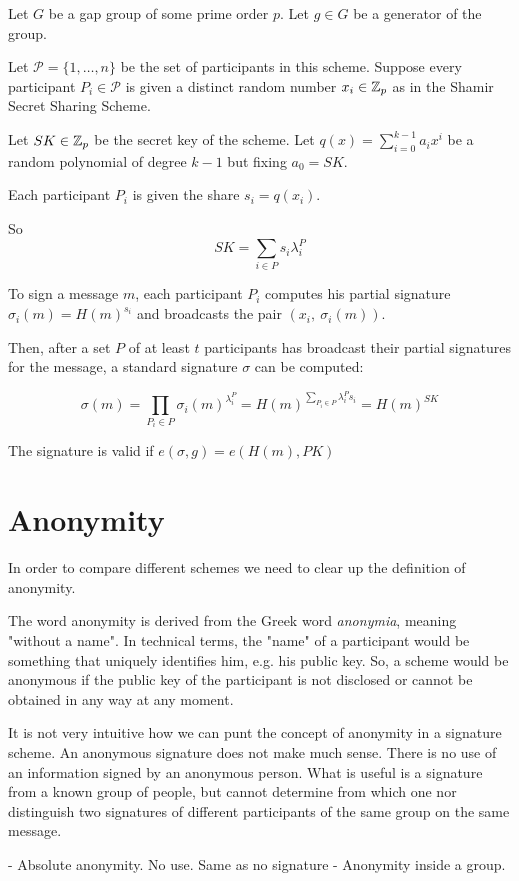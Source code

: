Let $G$ be a gap group of some prime order $p$. Let $g \in G$ be a generator of the group.

Let $\mathcal{P}= \{ 1, \dots , n \}$ be the set of participants in this scheme. Suppose every participant $P_i \in \mathcal{P}$ is given a distinct random number $x_i \in {\mathbb Z}_p$ as in the Shamir Secret Sharing Scheme.

Let $SK \in {\mathbb Z}_p$ be the secret key of the scheme. Let $q(x) = \sum_{i=0}^{k-1} a_i x^i$ be a random polynomial of degree $k-1$ but fixing $a_0 = SK$.

Each participant $P_i$ is given the share $s_i = q(x_i)$.

So $$SK = \sum_{i \in P} s_i \lambda_i^P$$

To sign a message $m$, each participant $P_i$ computes his partial signature $\sigma_i (m) = H(m)^{s_i}$ and broadcasts the pair $(x_i, \ \sigma_i (m))$.

Then, after a set $P$ of at least $t$ participants has broadcast their partial signatures for the message, a standard signature $\sigma$ can be computed:

$$ \sigma (m) = \prod_{P_i \in P} \sigma_i (m)^{\lambda_i^{P}}= H(m)^{\sum_{P_i \in P} \lambda_i^P s_i} = H(m)^{SK}$$

The signature is valid if $e(\sigma, g) = e(H(m), PK)$

\section{Anonymity}

In order to compare different schemes we need to clear up the definition of anonymity.

The word anonymity is derived from the Greek word \textit{anonymia}, meaning "without a name". In technical terms, the "name" of a participant would be something that uniquely identifies him, e.g. his public key. So, a scheme would be anonymous if the public key of the participant is not disclosed or cannot be obtained in any way at any moment.

It is not very intuitive how we can punt the concept of anonymity in a signature scheme. An anonymous signature does not make much sense. There is no use of an information signed by an anonymous person. What is useful is a signature from a known group of people, but cannot determine from which one nor distinguish two signatures of different participants of the same group on the same message.

- Absolute anonymity. No use. Same as no signature
- Anonymity inside a group. 



